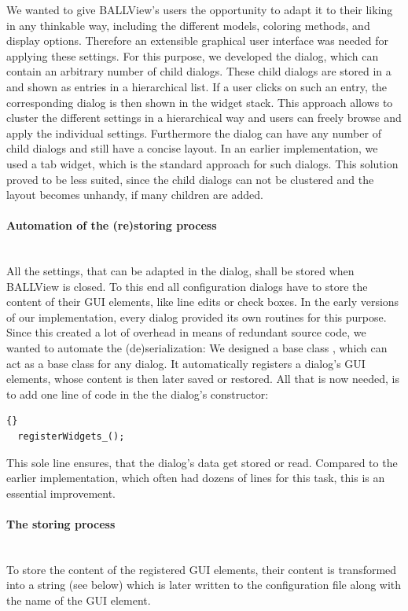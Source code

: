 We wanted to give BALLView's users the opportunity to adapt it to their liking in any
thinkable way, including the different models, coloring methods, and display options. 
Therefore an extensible graphical user interface was needed for applying these settings. 
For this purpose, we developed the  dialog, which can contain an 
arbitrary number of child dialogs. 
These child dialogs are stored in a  and shown as entries in 
a hierarchical list. 
If a user clicks on such an entry, the corresponding dialog is then shown in the 
widget stack.
This approach allows to cluster the different settings in a hierarchical way
and users can freely browse and apply the individual settings.
Furthermore the  dialog can have any number of child dialogs and still 
have a concise layout.
In an earlier implementation, we used a tab widget, which is the standard approach for
such dialogs. This solution proved to be less suited, since the child dialogs can not
be clustered and the layout becomes unhandy, if many children are added.

\paragraph{Automation of the (re)storing process}
\hspace*{\fill}\\
All the settings, that can be adapted in the  dialog, shall be 
stored when BALLView is closed.
To this end all configuration dialogs have to store the content of their GUI elements,
like line edits or check boxes.
In the early versions of our implementation, every dialog provided its
own routines for this purpose.
Since this created a lot of overhead in means of redundant source code,
we wanted to automate the (de)serialization:
We designed a base class , which can act as a base class for any dialog.
It automatically registers a dialog's GUI elements, whose content is then later
saved or restored.
All that is now needed, is to add one line of code in the 
the dialog's constructor:
\begin{lstlisting}{}
  registerWidgets_();
\end{lstlisting}

This sole line ensures, that the dialog's data get stored or read.
Compared to the earlier implementation, which often had dozens of lines
for this task, this is an essential improvement.

\paragraph{The storing process}
\hspace*{\fill}\\
To store the content of the registered GUI elements, their content
is transformed into a string (see below) which is later written to the configuration
file along with the name of the GUI element.

